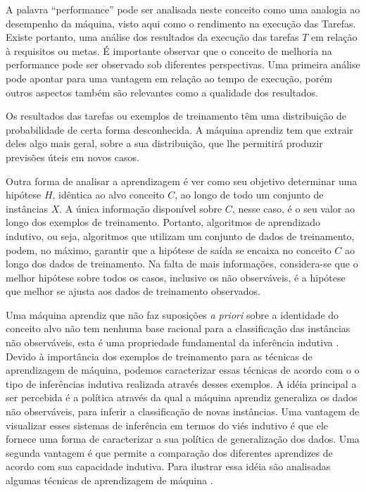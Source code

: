 \documentclass[dm,ppgcomp]{texfurg}
\begin{document}
A palavra “performance” pode ser analisada neste conceito como uma analogia ao desempenho da máquina, visto aqui como o rendimento na execução das Tarefas. Existe portanto, uma análise dos resultados da execução das tarefas $T$ em relação à requisitos ou metas. É importante observar que o conceito de melhoria na performance pode ser observado sob diferentes perspectivas. Uma primeira análise pode apontar para uma vantagem em relação ao tempo de execução, porém outros aspectos também são relevantes como a qualidade dos resultados. 

Os resultados das tarefas ou exemplos de treinamento têm uma distribuição de probabilidade de certa forma desconhecida. A máquina aprendiz tem que extrair deles algo mais geral, sobre a sua distribuição, que lhe permitirá produzir previsões úteis em novos casos.

Outra forma de analisar a aprendizagem é ver como seu objetivo determinar uma hipótese $H$, idêntica ao alvo conceito $C$, ao longo de todo um conjunto de instâncias $X$. A única informação disponível sobre $C$, nesse caso, é o seu valor ao longo dos exemplos de treinamento. Portanto, algoritmos de aprendizado indutivo, ou seja, algoritmos que utilizam um conjunto de dados de treinamento, podem, no máximo, garantir que a hipótese de saída se encaixa no conceito $C$ ao longo dos dados de treinamento. Na falta de mais informações, considera-se que o melhor hipótese sobre todos os casos, inclusive os não observáveis, é a hipótese que melhor se ajusta aos dados de treinamento observados. 

Uma máquina aprendiz que não faz suposições {\it a priori} sobre a identidade do conceito alvo não tem nenhuma base racional para a classificação das instâncias não observáveis, esta é uma propriedade fundamental da inferência indutiva \cite{anderson1986machine}. Devido à importância dos exemplos de treinamento para as técnicas de aprendizagem de máquina, podemos caracterizar essas técnicas de acordo com o o tipo de inferências indutiva realizada através desses exemplos. A idéia principal a ser percebida é a política através da qual a máquina aprendiz generaliza os dados não observáveis, para inferir a classificação de novas instâncias. Uma vantagem de visualizar esses sistemas de inferência em termos do viés indutivo é que ele fornece uma forma de caracterizar a sua política de generalização dos dados. Uma segunda vantagem é que permite a comparação dos diferentes aprendizes de acordo com sua capacidade indutiva. Para ilustrar essa idéia são analisadas algumas técnicas de aprendizagem de máquina \cite{anderson1986machine}. 
\end{document}
